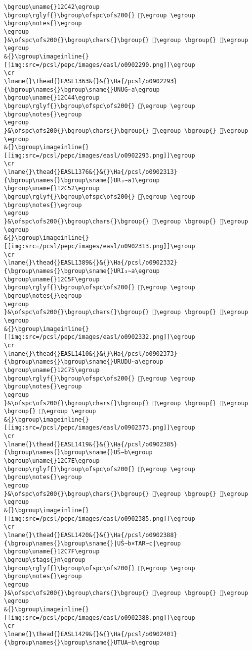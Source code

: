 \begin{verbatim}
\bgroup\uname{}12C42\egroup
\bgroup\rglyf{}\bgroup\ofspc\ofs200{} 𒱂\egroup \egroup
\bgroup\notes{}\egroup
\egroup
}&\ofspc\ofs200{}\bgroup\chars{}\bgroup{} 𒱃\egroup \bgroup{} 𒱂\egroup \egroup
&{}\bgroup\imageinline{}[[img:src=/pcsl/pepc/images/easl/o0902290.png]]\egroup
\cr
\lname{}\thead{}EASL1363&{}&{}\Ha{/pcsl/o0902293}{\bgroup\names{}\bgroup\sname{}UNUG∼a\egroup
\bgroup\uname{}12C44\egroup
\bgroup\rglyf{}\bgroup\ofspc\ofs200{} 𒱄\egroup \egroup
\bgroup\notes{}\egroup
\egroup
}&\ofspc\ofs200{}\bgroup\chars{}\bgroup{} 𒱆\egroup \bgroup{} 𒱄\egroup \egroup
&{}\bgroup\imageinline{}[[img:src=/pcsl/pepc/images/easl/o0902293.png]]\egroup
\cr
\lname{}\thead{}EASL1376&{}&{}\Ha{/pcsl/o0902313}{\bgroup\names{}\bgroup\sname{}UR₃∼a1\egroup
\bgroup\uname{}12C52\egroup
\bgroup\rglyf{}\bgroup\ofspc\ofs200{} 𒱒\egroup \egroup
\bgroup\notes{}\egroup
\egroup
}&\ofspc\ofs200{}\bgroup\chars{}\bgroup{} 𒱒\egroup \bgroup{} 𒱓\egroup \egroup
&{}\bgroup\imageinline{}[[img:src=/pcsl/pepc/images/easl/o0902313.png]]\egroup
\cr
\lname{}\thead{}EASL1389&{}&{}\Ha{/pcsl/o0902332}{\bgroup\names{}\bgroup\sname{}URI₃∼a\egroup
\bgroup\uname{}12C5F\egroup
\bgroup\rglyf{}\bgroup\ofspc\ofs200{} 𒱟\egroup \egroup
\bgroup\notes{}\egroup
\egroup
}&\ofspc\ofs200{}\bgroup\chars{}\bgroup{} 𒱟\egroup \bgroup{} 𒱠\egroup \egroup
&{}\bgroup\imageinline{}[[img:src=/pcsl/pepc/images/easl/o0902332.png]]\egroup
\cr
\lname{}\thead{}EASL1410&{}&{}\Ha{/pcsl/o0902373}{\bgroup\names{}\bgroup\sname{}URUDU∼a\egroup
\bgroup\uname{}12C75\egroup
\bgroup\rglyf{}\bgroup\ofspc\ofs200{} 𒱵\egroup \egroup
\bgroup\notes{}\egroup
\egroup
}&\ofspc\ofs200{}\bgroup\chars{}\bgroup{} 𒱳\egroup \bgroup{} 𒱴\egroup \bgroup{} 𒱵\egroup \egroup
&{}\bgroup\imageinline{}[[img:src=/pcsl/pepc/images/easl/o0902373.png]]\egroup
\cr
\lname{}\thead{}EASL1419&{}&{}\Ha{/pcsl/o0902385}{\bgroup\names{}\bgroup\sname{}UŠ∼b\egroup
\bgroup\uname{}12C7E\egroup
\bgroup\rglyf{}\bgroup\ofspc\ofs200{} 𒱾\egroup \egroup
\bgroup\notes{}\egroup
\egroup
}&\ofspc\ofs200{}\bgroup\chars{}\bgroup{} 𒱾\egroup \bgroup{} 𒲁\egroup \egroup
&{}\bgroup\imageinline{}[[img:src=/pcsl/pepc/images/easl/o0902385.png]]\egroup
\cr
\lname{}\thead{}EASL1420&{}&{}\Ha{/pcsl/o0902388}{\bgroup\names{}\bgroup\sname{}|UŠ∼b×TAR∼c|\egroup
\bgroup\uname{}12C7F\egroup
\bgroup\stags{}n\egroup
\bgroup\rglyf{}\bgroup\ofspc\ofs200{} 𒱿\egroup \egroup
\bgroup\notes{}\egroup
\egroup
}&\ofspc\ofs200{}\bgroup\chars{}\bgroup{} 𒲂\egroup \bgroup{} 𒱿\egroup \egroup
&{}\bgroup\imageinline{}[[img:src=/pcsl/pepc/images/easl/o0902388.png]]\egroup
\cr
\lname{}\thead{}EASL1429&{}&{}\Ha{/pcsl/o0902401}{\bgroup\names{}\bgroup\sname{}UTUA∼b\egroup

\end{verbatim}
